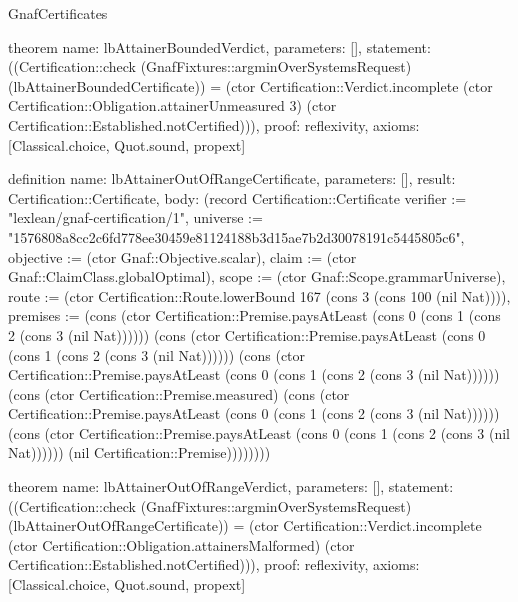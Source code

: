 \begin{lexlean}{GnafCertificates}
\begin{semanticmodule}
theorem{
  name: lbAttainerBoundedVerdict,
  parameters: [],
  statement: ((Certification::check (GnafFixtures::argminOverSystemsRequest) (lbAttainerBoundedCertificate)) = (ctor Certification::Verdict.incomplete (ctor Certification::Obligation.attainerUnmeasured 3) (ctor Certification::Established.notCertified))),
  proof: reflexivity{},
  axioms: [Classical.choice, Quot.sound, propext]
}

definition{
  name: lbAttainerOutOfRangeCertificate,
  parameters: [],
  result: Certification::Certificate,
  body: (record Certification::Certificate {verifier := "lexlean/gnaf-certification/1", universe := "1576808a8cc2c6fd778ee30459e81124188b3d15ae7b2d30078191c5445805c6", objective := (ctor Gnaf::Objective.scalar), claim := (ctor Gnaf::ClaimClass.globalOptimal), scope := (ctor Gnaf::Scope.grammarUniverse), route := (ctor Certification::Route.lowerBound 167 (cons 3 (cons 100 (nil Nat)))), premises := (cons (ctor Certification::Premise.paysAtLeast (cons 0 (cons 1 (cons 2 (cons 3 (nil Nat)))))) (cons (ctor Certification::Premise.paysAtLeast (cons 0 (cons 1 (cons 2 (cons 3 (nil Nat)))))) (cons (ctor Certification::Premise.paysAtLeast (cons 0 (cons 1 (cons 2 (cons 3 (nil Nat)))))) (cons (ctor Certification::Premise.measured) (cons (ctor Certification::Premise.paysAtLeast (cons 0 (cons 1 (cons 2 (cons 3 (nil Nat)))))) (cons (ctor Certification::Premise.paysAtLeast (cons 0 (cons 1 (cons 2 (cons 3 (nil Nat)))))) (nil Certification::Premise)))))))})
}

theorem{
  name: lbAttainerOutOfRangeVerdict,
  parameters: [],
  statement: ((Certification::check (GnafFixtures::argminOverSystemsRequest) (lbAttainerOutOfRangeCertificate)) = (ctor Certification::Verdict.incomplete (ctor Certification::Obligation.attainersMalformed) (ctor Certification::Established.notCertified))),
  proof: reflexivity{},
  axioms: [Classical.choice, Quot.sound, propext]
}


\end{semanticmodule}
\end{lexlean}
